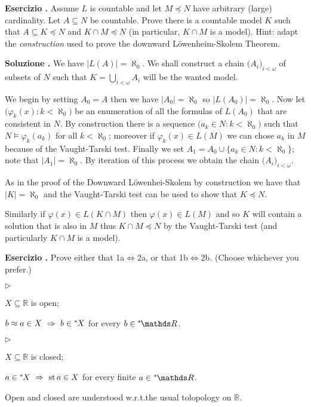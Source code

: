 \documentclass[10pt]{article}
\def\phi{\varphi}
\def\RR{\mathds R}
\def\IMP{\Rightarrow}
\def\IFF{\Leftrightarrow}
\newcommand{\labella}[1]{{\sf\footnotesize #1}\hfill}
\renewenvironment{itemize}
  {\begin{list}{$\triangleright$}{%
   \setlength{\parskip}{0mm}
   \setlength{\topsep}{0mm}
   \setlength{\rightmargin}{0mm}
   \setlength{\listparindent}{0mm}
   \setlength{\itemindent}{0mm}
   \setlength{\labelwidth}{3ex}
   \setlength{\itemsep}{0mm}
   \setlength{\parsep}{0mm}
   \setlength{\partopsep}{0mm}
   \setlength{\labelsep}{1ex}
   \setlength{\leftmargin}{\labelwidth+\labelsep}
   \let\makelabel\labella}}{%
   \end{list}}
\newcounter{ex}
\newenvironment{exercise}{\clearpage\addtocounter{ex}{1}\textbf{Esercizio \theex.\quad}}{}
\newcounter{sol}
\newenvironment{solution}{\addtocounter{sol}{1}\textbf{Soluzione \theex.\quad}}{}
\def\nsR{{}^*\kern-.2ex\RR}
\def\ns{{}^*\kern-.2ex}
\def\st{{\rm st}}
\def\ssf#1{\textsf{#1}}
\begin{document}
\begin{exercise}
  Assume $L$ is countable and let $M\preceq N$ have arbitrary (large) cardinality.
  Let $A\subseteq N$ be countable.
  Prove there is a countable model $K$ such that $A\subseteq K\preceq N$ and $K\cap M\preceq N$ (in particular, $K\cap M$ is a model).
  Hint: adapt the \textit{construction\/} used to prove the downward L\"owenheim-Skolem Theorem.
\end{exercise}

\begin{solution}
  We have \(|L(A)| = \aleph_0\).
  We shall construct a chain \(\big(A_i\big)_{i<\omega}\) of subsets of \(N\) such that \(K = \bigcup_{i<\omega}A_i\) will be the wanted model.

  We begin by setting \(A_0 = A\) then we have \(|A_0| = \aleph_0\) so \(|L(A_0)| = \aleph_0\).
  Now let \(\big(\phi_k(x)\colon k < \aleph_0\big)\) be an enumeration of all the formulas of \(L(A_0)\) that are consistent in \(N\).
  By construction there is a sequence \(\big(a_k\in N\colon k < \aleph_0\big)\) such that \(N\models \phi_k(a_k)\) for all \(k<\aleph_0\);
  moreover if \(\phi_k(x)\in L(M)\) we can chose \(a_k\) in \(M\) because of the Vaught-Tarski test.
  Finally we set \(A_1 = A_0 \cup \big\{a_k\in N\colon k<\aleph_0\big\}\); note that \(|A_1|=\aleph_0\).
  By iteration of this process we obtain the chain \(\big(A_i\big)_{i<\omega}\).

  As in the proof of the Downward L\"owenhei-Skolem by construction we have that \(|K| = \aleph_0\) and the Vaught-Tarski test can be used to show that \(K\preceq N\).

  Similarly if \(\phi(x)\in L(K\cap M)\) then \(\phi(x)\in L(M)\) and so \(K\) will contain a solution that is also in \(M\) thus \(K\cap M\preceq N\) by the Vaught-Tarski test (and particularly \(K\cap M\) is a model).
\end{solution}
  
\begin{exercise}
  Prove either that \ssf{1a}$\IFF$\ssf{2a}, or that \ssf{1b}$\IFF$\ssf{2b}. (Choose whichever you prefer.)

  \begin{minipage}{.5\textwidth}
    \begin{itemize}
    \item[1a.] $X\subseteq\RR$ is open;
    \item[2a.] $b\approx a\in X \ \IMP\ b\in\ns X$ for every $b\in\nsR$.
    \end{itemize}
  \end{minipage}
  \begin{minipage}{.5\textwidth}
    \begin{itemize}
    \item[1b.] $X\subseteq\RR$ is closed;
    \item[2b.] $a\in\ns X \ \IMP\ \st\, a\in X$ for every finite $a\in\nsR$.
    \end{itemize}
  \end{minipage}
  
  Open and closed are understood w.r.t.\@ the usual tolopology on $\RR$.
\end{exercise}
\end{document}
